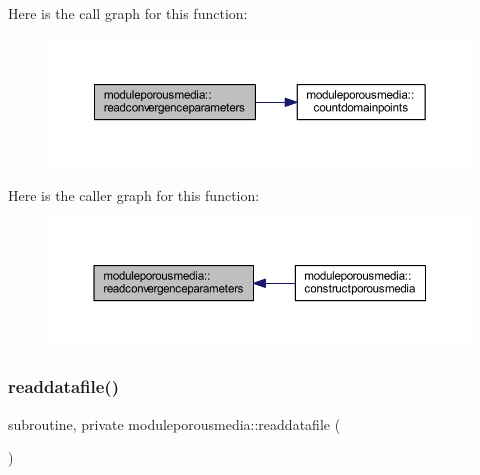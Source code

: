 Here is the call graph for this function\+:\nopagebreak
\begin{figure}[H]
\begin{center}
\leavevmode
\includegraphics[width=350pt]{namespacemoduleporousmedia_a8cce03cb321fdeb4b547654baa7cdf81_cgraph}
\end{center}
\end{figure}
Here is the caller graph for this function\+:\nopagebreak
\begin{figure}[H]
\begin{center}
\leavevmode
\includegraphics[width=350pt]{namespacemoduleporousmedia_a8cce03cb321fdeb4b547654baa7cdf81_icgraph}
\end{center}
\end{figure}
\mbox{\label{namespacemoduleporousmedia_a00f10b641a285b482aecd0a0d9289ed7}} 
\subsubsection{\texorpdfstring{readdatafile()}{readdatafile()}}
{\footnotesize\ttfamily subroutine, private moduleporousmedia\+::readdatafile (\begin{DoxyParamCaption}{ }\end{DoxyParamCaption})\hspace{0.3cm}{\ttfamily [private]}}

